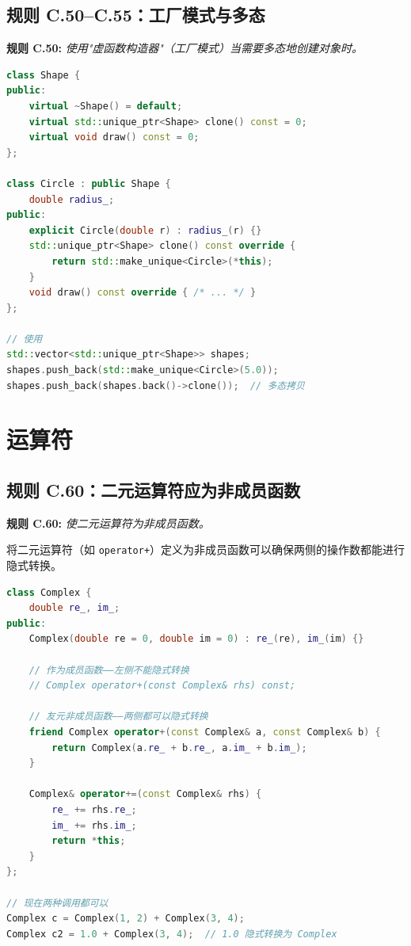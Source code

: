 \subsection{规则 C.50--C.55：工厂模式与多态}

\textbf{规则 C.50:} \textit{使用"虚函数构造器"（工厂模式）当需要多态地创建对象时。}

\begin{lstlisting}[language=C++]
class Shape {
public:
    virtual ~Shape() = default;
    virtual std::unique_ptr<Shape> clone() const = 0;
    virtual void draw() const = 0;
};

class Circle : public Shape {
    double radius_;
public:
    explicit Circle(double r) : radius_(r) {}
    std::unique_ptr<Shape> clone() const override {
        return std::make_unique<Circle>(*this);
    }
    void draw() const override { /* ... */ }
};

// 使用
std::vector<std::unique_ptr<Shape>> shapes;
shapes.push_back(std::make_unique<Circle>(5.0));
shapes.push_back(shapes.back()->clone());  // 多态拷贝
\end{lstlisting}

\section{运算符}

\subsection{规则 C.60：二元运算符应为非成员函数}

\textbf{规则 C.60:} \textit{使二元运算符为非成员函数。}

将二元运算符（如 \texttt{operator+}）定义为非成员函数可以确保两侧的操作数都能进行隐式转换。

\begin{lstlisting}[language=C++]
class Complex {
    double re_, im_;
public:
    Complex(double re = 0, double im = 0) : re_(re), im_(im) {}

    // 作为成员函数——左侧不能隐式转换
    // Complex operator+(const Complex& rhs) const;

    // 友元非成员函数——两侧都可以隐式转换
    friend Complex operator+(const Complex& a, const Complex& b) {
        return Complex(a.re_ + b.re_, a.im_ + b.im_);
    }

    Complex& operator+=(const Complex& rhs) {
        re_ += rhs.re_;
        im_ += rhs.im_;
        return *this;
    }
};

// 现在两种调用都可以
Complex c = Complex(1, 2) + Complex(3, 4);
Complex c2 = 1.0 + Complex(3, 4);  // 1.0 隐式转换为 Complex
\end{lstlisting}

